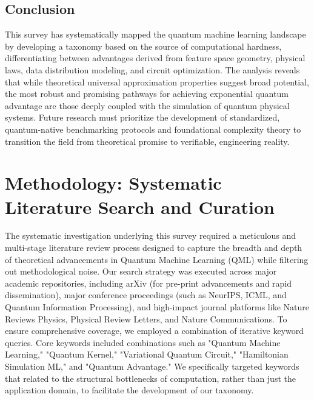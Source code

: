 \documentclass{article}
\begin{document}
\subsection{Conclusion}

\label{sec:conclusion}

This survey has systematically mapped the quantum machine learning landscape by developing a taxonomy based on the source of computational hardness, differentiating between advantages derived from feature space geometry, physical laws, data distribution modeling, and circuit optimization. The analysis reveals that while theoretical universal approximation properties suggest broad potential, the most robust and promising pathways for achieving exponential quantum advantage are those deeply coupled with the simulation of quantum physical systems. Future research must prioritize the development of standardized, quantum-native benchmarking protocols and foundational complexity theory to transition the field from theoretical promise to verifiable, engineering reality.

\section{Methodology: Systematic Literature Search and Curation}

\label{sec:methodology\_systematic\_literature\_search}

The systematic investigation underlying this survey required a meticulous and multi-stage literature review process designed to capture the breadth and depth of theoretical advancements in Quantum Machine Learning (QML) while filtering out methodological noise. Our search strategy was executed across major academic repositories, including arXiv (for pre-print advancements and rapid dissemination), major conference proceedings (such as NeurIPS, ICML, and Quantum Information Processing), and high-impact journal platforms like Nature Reviews Physics, Physical Review Letters, and Nature Communications. To ensure comprehensive coverage, we employed a combination of iterative keyword queries. Core keywords included combinations such as "Quantum Machine Learning," "Quantum Kernel," "Variational Quantum Circuit," "Hamiltonian Simulation ML," and "Quantum Advantage." We specifically targeted keywords that related to the structural bottlenecks of computation, rather than just the application domain, to facilitate the development of our taxonomy.
\end{document}
